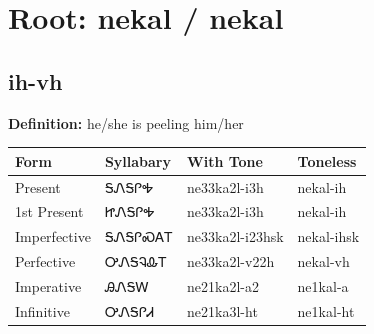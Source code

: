 \documentclass{article}%
\begin{document}
%
\normalsize%
\section*{Root: nekal / nekal}%
\subsection*{ih-vh}%
\textbf{Definition: }%
he/she is peeling him/her%
\\[0.5em]%
\begin{tabular}{|l|l|l|l|}%
\hline%
\textbf{Form}&\textbf{Syllabary}&\textbf{With Tone}&\textbf{Toneless}\\%
\hline%
Present&ᎦᏁᎦᎵᎭ&ne33ka2l{-}i3h&nekal{-}ih\\%
1st Present&ᏥᏁᎦᎵᎭ&ne33ka2l{-}i3h&nekal{-}ih\\%
Imperfective&ᎦᏁᎦᎵᏍᎪᎢ&ne33ka2l{-}i23hsk&nekal{-}ihsk\\%
Perfective&ᎤᏁᎦᎸᎲᎢ&ne33ka2l{-}v22h&nekal{-}vh\\%
Imperative&ᎯᏁᎦᎳ&ne21ka2l{-}a2&ne1kal{-}a\\%
Infinitive&ᎤᏁᎦᎵᏗ&ne21ka3l{-}ht&ne1kal{-}ht\\%
\hline%
\end{tabular}%
\\[1em]%
\end{document}
